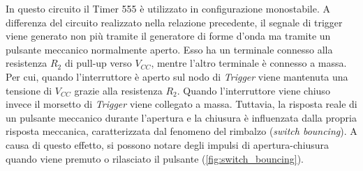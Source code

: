\noindent
In questo circuito il Timer 555 è utilizzato in configurazione monostabile. A differenza del circuito realizzato nella relazione precedente, il segnale di trigger viene generato non più tramite il generatore di forme d'onda ma tramite un pulsante meccanico normalmente aperto. 
Esso ha un terminale connesso alla resistenza $R_2$ di pull-up verso $V_{CC}$, mentre l'altro terminale è connesso a massa. Per cui, quando l'interruttore è aperto sul nodo di \textit{Trigger} viene mantenuta una tensione di $V_{CC}$ grazie alla resistenza $R_2$. Quando l'interruttore viene chiuso invece il morsetto di \textit{Trigger} viene collegato a massa. Tuttavia, la risposta reale di un pulsante meccanico durante l'apertura e la chiusura è influenzata dalla propria risposta meccanica, caratterizzata dal fenomeno del rimbalzo (\textit{switch bouncing}). A causa di questo effetto, si possono notare degli impulsi di apertura-chiusura quando viene premuto o rilasciato il pulsante (\Fig\ref{fig:switch_bouncing}).
